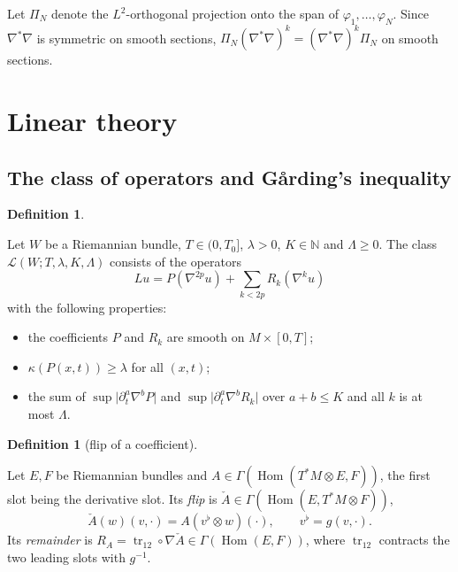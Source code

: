 \documentclass[11pt,reqno]{amsart}
\theoremstyle{definition}
\newtheorem{definition}[theorem]{Definition}
\theoremstyle{remark}
\newcommand{\N}{\mathbb{N}}
\newcommand{\Lcl}{\mathcal{L}}
\newcommand{\Hom}{\operatorname{Hom}}
\newcommand{\abs}[1]{\lvert #1\rvert}
\newcommand{\Lap}{\nabla^{*}\nabla}
\newcommand{\lean}[1]{}
\newcommand{\uses}[1]{}
\numberwithin{equation}{section}
\begin{document}
Let $\Pi_N$ denote the $L^2$-orthogonal projection onto the span of $\varphi_1,\dots,\varphi_N$. Since
$\Lap$ is symmetric on smooth sections, $\Pi_N(\Lap)^k=(\Lap)^k\Pi_N$ on smooth sections.

\section{Linear theory}\label{sec:linear}

\subsection{The class of operators and G\aa rding's inequality}

\begin{definition}\label{def:class}
\lean{ShortTime.LinearOp, ShortTime.LinearOp.apply, ShortTime.LinearOp.Solves, ShortTime.LinearOp.IsParabolic}
\uses{def:legendre}
Let $W$ be a Riemannian bundle, $T\in(0,T_0]$, $\lambda>0$, $K\in\N$ and $\Lambda\ge0$. The class
$\Lcl(W;T,\lambda,K,\Lambda)$ consists of the operators
\[
  Lu=P(\nabla^{2p}u)+\sum_{k<2p}R_k(\nabla^ku)
\]
with the following properties:
\begin{itemize}[nosep]
\item the coefficients $P$ and $R_k$ are smooth on $M\times[0,T]$;
\item $\kappa(P(x,t))\ge\lambda$ for all $(x,t)$;
\item the sum of $\sup\abs{\partial_t^a\nabla^bP}$ and $\sup\abs{\partial_t^a\nabla^bR_k}$ over
  $a+b\le K$ and all $k$ is at most $\Lambda$.
\end{itemize}
\end{definition}

\begin{definition}[flip of a coefficient]\label{def:flip}
\lean{ShortTime.flipField, ShortTime.flipRemainder}
Let $E,F$ be Riemannian bundles and $A\in\Gamma(\Hom(T^*M\otimes E,F))$, the first slot being the
derivative slot. Its \emph{flip} is $\check A\in\Gamma(\Hom(E,T^*M\otimes F))$,
\[
  \check A(w)(v,\cdot)=A(v^\flat\otimes w)(\cdot),\qquad v^\flat=g(v,\cdot).
\]
Its \emph{remainder} is $R_A=\operatorname{tr}_{12}\circ\nabla\check A\in\Gamma(\Hom(E,F))$, where
$\operatorname{tr}_{12}$ contracts the two leading slots with $g^{-1}$.
\end{definition}
\end{document}
